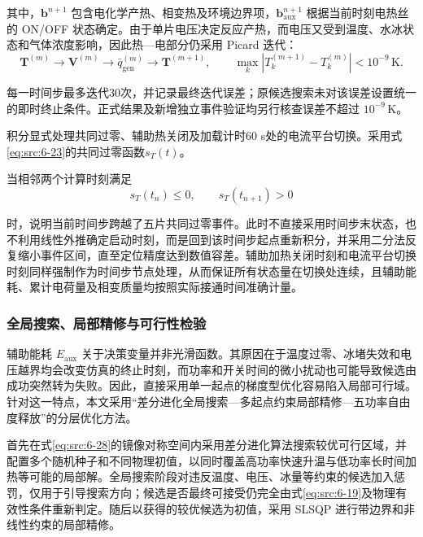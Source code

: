 \documentclass[bwprint]{gmcmthesis}
\numberwithin{equation}{section}
\numberwithin{figure}{section}
\begin{document}
 其中，\(\mathbf{b}^{n+1}\) 包含电化学产热、相变热及环境边界项，\(\mathbf{b}_{\text{aux}}^{n+1}\) 根据当前时刻电热丝的 ON/OFF 状态确定。由于单片电压决定反应产热，而电压又受到温度、水冰状态和气体浓度影响，因此热—电部分仍采用 Picard 迭代：
\begin{equation}
\boldsymbol{T}^{(m)} \to \boldsymbol{V}^{(m)} \to \bar{q}_{\text{gen}}^{(m)} \to \boldsymbol{T}^{(m+1)}, \qquad \max_k \left| T_k^{(m+1)} - T_k^{(m)} \right| < 10^{-9} \, \text{K}. \label{eq:src:6-39}
\end{equation}

 每一时间步最多迭代30次，并记录最终迭代误差；原候选搜索未对该误差设置统一的即时终止条件。正式结果及新增独立事件验证均另行核查误差不超过 \(10^{-9}\,\mathrm K\)。

 积分显式处理共同过零、辅助热关闭及加载计时60 s处的电流平台切换。采用式\eqref{eq:src:6-23}的共同过零函数$s_T(t)$。

 当相邻两个计算时刻满足
\begin{equation}
s_T(t_n) \leq 0, \qquad s_T(t_{n+1}) > 0 \label{eq:src:6-41}
\end{equation}

\noindent 时，说明当前时间步跨越了五片共同过零事件。此时不直接采用时间步末状态，也不利用线性外推确定启动时刻，而是回到该时间步起点重新积分，并采用二分法反复缩小事件区间，直至定位精度达到数值容差。辅助加热关闭时刻和电流平台切换时刻同样强制作为时间步节点处理，从而保证所有状态量在切换处连续，且辅助能耗、累计电荷量及相变质量均按照实际接通时间准确计量。

\subsubsection{全局搜索、局部精修与可行性检验}

 辅助能耗 \(E_{\text{aux}}\) 关于决策变量并非光滑函数。其原因在于温度过零、冰堵失效和电压越界均会改变仿真的终止时刻，而功率和开关时间的微小扰动也可能导致候选由成功突然转为失败。因此，直接采用单一起点的梯度型优化容易陷入局部可行域。针对这一特点，本文采用“差分进化全局搜索—多起点约束局部精修—五功率自由度释放”的分层优化方法。

 首先在式\eqref{eq:src:6-28}的镜像对称空间内采用差分进化算法搜索较优可行区域，并配置多个随机种子和不同物理初值，以同时覆盖高功率快速升温与低功率长时间加热等可能的局部解。全局搜索阶段对违反温度、电压、冰量等约束的候选加入惩罚，仅用于引导搜索方向；候选是否最终可接受仍完全由式\eqref{eq:src:6-19}及物理有效性条件重新判定。随后以获得的较优候选为初值，采用 SLSQP 进行带边界和非线性约束的局部精修。
\end{document}

